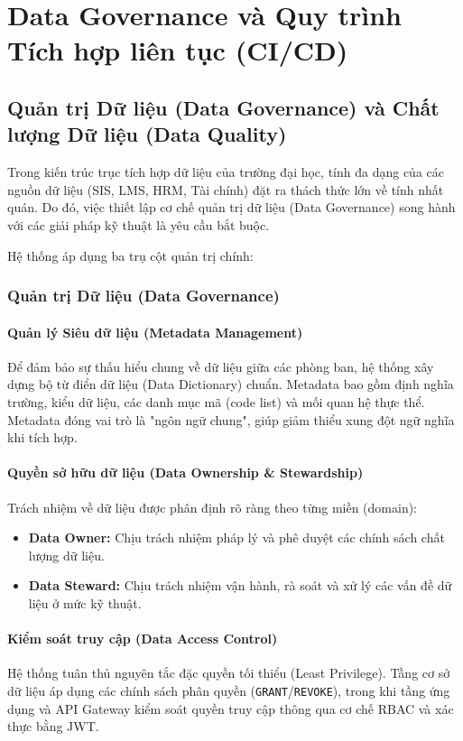 \chapter{Data Governance và Quy trình Tích hợp liên tục (CI/CD)}
\label{ch:data_gov}

\section{Quản trị Dữ liệu (Data Governance) và Chất lượng Dữ liệu (Data Quality)}

Trong kiến trúc trục tích hợp dữ liệu của trường đại học, tính đa dạng của các nguồn dữ liệu (SIS, LMS, HRM, Tài chính) đặt ra thách thức lớn về tính nhất quán. Do đó, việc thiết lập cơ chế quản trị dữ liệu (Data Governance) song hành với các giải pháp kỹ thuật là yêu cầu bắt buộc.

Hệ thống áp dụng ba trụ cột quản trị chính:

\subsection{Quản trị Dữ liệu (Data Governance)}

\subsubsection{Quản lý Siêu dữ liệu (Metadata Management)}
Để đảm bảo sự thấu hiểu chung về dữ liệu giữa các phòng ban, hệ thống xây dựng bộ từ điển dữ liệu (Data Dictionary) chuẩn. Metadata bao gồm định nghĩa trường, kiểu dữ liệu, các danh mục mã (code list) và mối quan hệ thực thể. Metadata đóng vai trò là "ngôn ngữ chung", giúp giảm thiểu xung đột ngữ nghĩa khi tích hợp.

\subsubsection{Quyền sở hữu dữ liệu (Data Ownership \& Stewardship)}
Trách nhiệm về dữ liệu được phân định rõ ràng theo từng miền (domain):
\begin{itemize}
    \item \textbf{Data Owner:} Chịu trách nhiệm pháp lý và phê duyệt các chính sách chất lượng dữ liệu.
    \item \textbf{Data Steward:} Chịu trách nhiệm vận hành, rà soát và xử lý các vấn đề dữ liệu ở mức kỹ thuật.
\end{itemize}

\subsubsection{Kiểm soát truy cập (Data Access Control)}
Hệ thống tuân thủ nguyên tắc đặc quyền tối thiểu (Least Privilege). Tầng cơ sở dữ liệu áp dụng các chính sách phân quyền (\texttt{GRANT}/\texttt{REVOKE}), trong khi tầng ứng dụng và API Gateway kiểm soát quyền truy cập thông qua cơ chế RBAC và xác thực bằng JWT.

